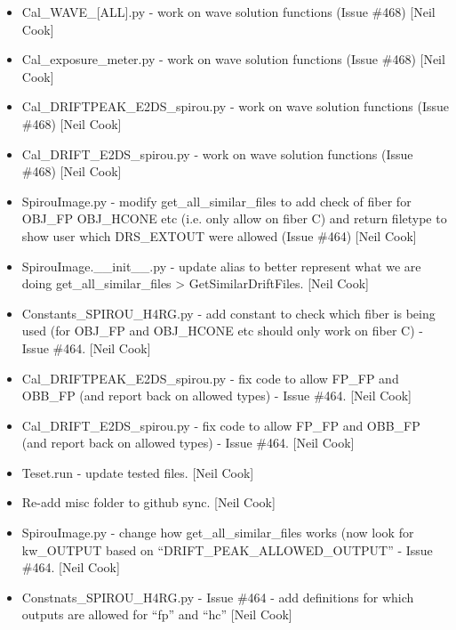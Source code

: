 \documentclass[a4paper,10pt,english]{report}
\begin{document}
\begin{itemize}
\item {} 
Cal\_WAVE\_{[}ALL{]}.py - work on wave solution functions (Issue \#468) {[}Neil
Cook{]}

\item {} 
Cal\_exposure\_meter.py - work on wave solution functions (Issue \#468)
{[}Neil Cook{]}

\item {} 
Cal\_DRIFTPEAK\_E2DS\_spirou.py - work on wave solution functions (Issue
\#468) {[}Neil Cook{]}

\item {} 
Cal\_DRIFT\_E2DS\_spirou.py - work on wave solution functions (Issue
\#468) {[}Neil Cook{]}

\item {} 
SpirouImage.py - modify get\_all\_similar\_files to add check of fiber
for OBJ\_FP OBJ\_HCONE etc (i.e. only allow on fiber C) and return
filetype to show user which DRS\_EXTOUT were allowed (Issue \#464) {[}Neil
Cook{]}

\item {} 
SpirouImage.\_\_init\_\_.py - update alias to better represent what we are
doing get\_all\_similar\_files \textendash{}\textgreater{} GetSimilarDriftFiles. {[}Neil Cook{]}

\item {} 
Constants\_SPIROU\_H4RG.py - add constant to check which fiber is being
used (for OBJ\_FP and OBJ\_HCONE etc should only work on fiber C)  -
Issue \#464. {[}Neil Cook{]}

\item {} 
Cal\_DRIFTPEAK\_E2DS\_spirou.py - fix code to allow FP\_FP and OBB\_FP (and
report back on allowed types) - Issue \#464. {[}Neil Cook{]}

\item {} 
Cal\_DRIFT\_E2DS\_spirou.py - fix code to allow FP\_FP and OBB\_FP (and
report back on allowed types) - Issue \#464. {[}Neil Cook{]}

\item {} 
Teset.run - update tested files. {[}Neil Cook{]}

\item {} 
Re-add misc folder to github sync. {[}Neil Cook{]}

\item {} 
SpirouImage.py - change how get\_all\_similar\_files works (now look for
kw\_OUTPUT based on “DRIFT\_PEAK\_ALLOWED\_OUTPUT” - Issue \#464. {[}Neil
Cook{]}

\item {} 
Constnats\_SPIROU\_H4RG.py - Issue \#464 - add definitions for which
outputs are allowed for “fp” and “hc” {[}Neil Cook{]}


\end{itemize}
\end{document}

